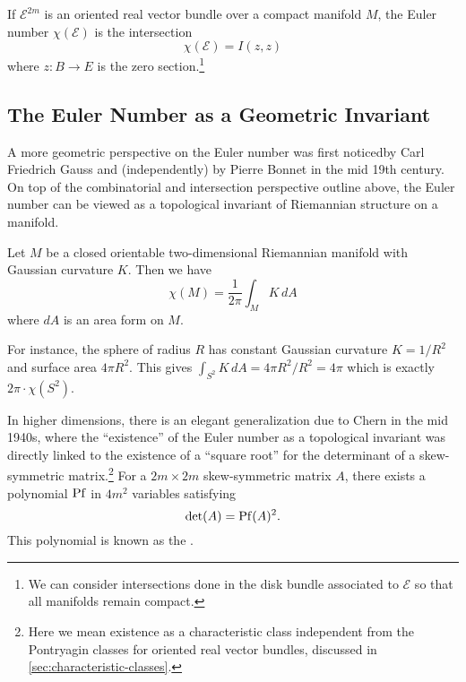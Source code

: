 \begin{definition}\label{def:euler-number-self-intersection}
  If $\mathcal{E}^{2m}$ is an oriented real vector bundle over a compact manifold $M$, 
	the Euler number $\chi(\mathcal{E})$ is the intersection
	\[
		\chi(\mathcal{E}) = I(z,z)
	\]
	where $z : B \to E$ is the zero section.\footnote{We can consider intersections done in the disk bundle associated to $\mathcal{E}$ so that all manifolds remain compact.}
\end{definition}

\subsection{The Euler Number as a Geometric Invariant}\label{sec:euler-number-geometric}

A more geometric perspective on the Euler number was first noticedby Carl Friedrich Gauss and (independently) by Pierre Bonnet in the mid 19th century. On top of the combinatorial and intersection perspective outline above, the Euler number can be viewed as a topological invariant of Riemannian structure on a manifold.

\begin{theorem}
  Let $M$ be a closed orientable two-dimensional Riemannian manifold with Gaussian curvature $K$. Then we have
  \[
    \chi(M) = \frac{1}{2\pi}\int_M K\,dA
  \]
  where $dA$ is an area form on $M$.
\end{theorem}
For instance, the sphere of radius $R$ has constant Gaussian curvature $K=1/R^2$ and surface area $4\pi R^2$. This gives $\int_{S^2}K\,dA =4\pi R^2/R^2=4\pi$ which is exactly $2\pi\cdot \chi(S^2)$.

In higher dimensions, there is an elegant generalization due to Chern in the mid 1940s, where the ``existence'' of the Euler number as a topological invariant was directly linked to the existence of a ``square root'' for the determinant of a skew-symmetric matrix.\footnote{Here we mean existence as a characteristic class independent from the Pontryagin classes for oriented real vector bundles, discussed in \cref{sec:characteristic-classes}.} For a $2m\times 2m$ skew-symmetric matrix $A$, there exists a polynomial $\operatorname{Pf}$ in $4m^2$ variables satisfying \[\det(A) = \operatorname{Pf}(A)^2.\] This polynomial is known as the .

